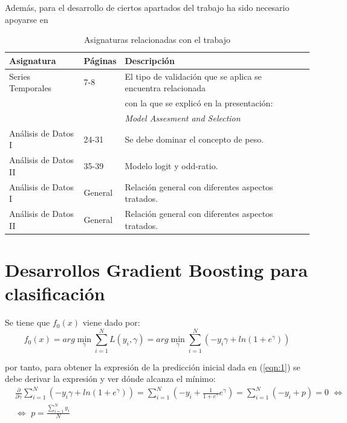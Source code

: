 \documentclass[12pt,twoside]{article}
\begin{document}
Además, para el desarrollo de ciertos apartados del trabajo ha sido necesario apoyarse en
\begin{table}[ht] 
\centering
\begin{tabular}{llll} 
  \hline
 Asignatura & Páginas & Descripción  \\ 
  \hline
Series Temporales & 7-8 & El tipo de validación que se aplica se encuentra relacionada  \\ 
 &  &  con la que se explicó en la presentación: \\ 
 &  & \textit{Model Assesment and Selection} \\ 
Análisis de Datos I & 24-31 & Se debe dominar el concepto de peso. \\
Análisis de Datos II & 35-39 & Modelo logit y odd-ratio.\\ 
Análisis de Datos I & General & Relación general con diferentes aspectos tratados. \\
Análisis de Datos II & General & Relación general con diferentes aspectos tratados. \\
\hline
\end{tabular}
\caption{Asignaturas relacionadas con el trabajo} \label{tab{03}}
\end{table}




\newpage
\appendix
\section{Desarrollos Gradient Boosting para clasificación} \label{Anexo2}

Se tiene que $f_0(x)$ viene dado por:
\begin{equation*}
f_0(x) = arg\min_{\gamma} \sum_{i=1}^N L(y_i, \gamma) = arg\min_{\gamma} \sum_{i=1}^N \left( -y_i \gamma + ln \left( 1 + e^{\gamma} \right) \right)
\end{equation*}

\noindent
por tanto, para obtener la expresión de la predicción inicial dada en (\ref{eqn:1}) se debe derivar la expresión y ver dónde alcanza el mínimo:
\begin{equation*}
\begin{split}
& \frac{\partial}{\partial \gamma}\sum_{i=1}^N \left( -y_i \gamma + ln \left( 1 + e^{\gamma} \right) \right) = \sum_{i=1}^N \left( -y_i + \frac{1}{1 + e^{\gamma}} e^{\gamma} \right) = \sum_{i=1}^N (-y_i + p) = 0 \, \, \Leftrightarrow  \\
& \Leftrightarrow \, \, p = \frac{\sum_{i=1}^{N} y_i}{N} 
\end{split}
\end{equation*}
\end{document}
